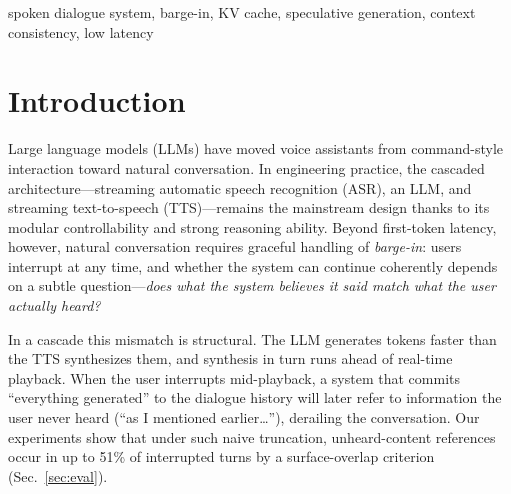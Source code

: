 \documentclass[conference]{IEEEtran}
\begin{document}
\begin{IEEEkeywords}
spoken dialogue system, barge-in, KV cache, speculative generation, context consistency, low latency
\end{IEEEkeywords}

\section{Introduction}
Large language models (LLMs) have moved voice assistants from command-style interaction toward natural conversation. In engineering practice, the cascaded architecture---streaming automatic speech recognition (ASR), an LLM, and streaming text-to-speech (TTS)---remains the mainstream design thanks to its modular controllability and strong reasoning ability. Beyond first-token latency, however, natural conversation requires graceful handling of \emph{barge-in}: users interrupt at any time, and whether the system can continue coherently depends on a subtle question---\emph{does what the system believes it said match what the user actually heard?}

In a cascade this mismatch is structural. The LLM generates tokens faster than the TTS synthesizes them, and synthesis in turn runs ahead of real-time playback. When the user interrupts mid-playback, a system that commits ``everything generated'' to the dialogue history will later refer to information the user never heard (``as I mentioned earlier\ldots''), derailing the conversation. Our experiments show that under such naive truncation, unheard-content references occur in up to 51\% of interrupted turns by a surface-overlap criterion (Sec.~\ref{sec:eval}).
\end{document}
